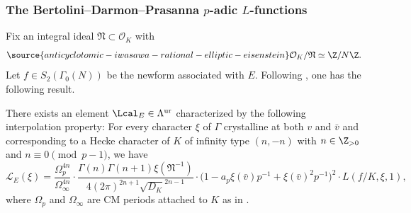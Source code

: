 \subsubsection{The Bertolini--Darmon--Prasanna \texorpdfstring{$p$}{p}-adic \texorpdfstring{$L$}{l}-functions}

Fix an integral ideal $\mathfrak{N}\subset\mathcal{O}_K$ with
\begin{equation}\label{eq:N}
\source{anticyclotomic-iwasawa-rational-elliptic-eisenstein}
\mathcal{O}_K/\mathfrak{N}\simeq\Z/N\Z.
\end{equation}
Let $f\in S_2(\Gamma_0(N))$ be the newform associated with $E$. Following \cite{BDP}, one has the following result.

\begin{theorem}
\notready\label{thm:BDP}
There exists an element $\Lcal_E\in\Lambda^{\rm ur}$ characterized by the following interpolation property: For every character $\xi$ of $\Gamma$ crystalline at both $v$ and $\bar{v}$ and corresponding to a Hecke character of $K$ of infinity type $(n,-n)$ with $n\in\Z_{>0}$ and $n\equiv 0\pmod{p-1}$, we have
\[
\mathcal{L}_E(\xi)=\frac{\Omega_p^{4n}}{\Omega_\infty^{4n}}\cdot\frac{\Gamma(n)\Gamma(n+1)\xi(\mathfrak{N}^{-1})}{4(2\pi)^{2n+1}\sqrt{D_K}^{2n-1}}\cdot\bigl(1-a_p\xi(\bar{v})p^{-1}+\xi(\bar{v})^2p^{-1}\bigr)^2\cdot L(f/K,\xi,1),
\]
where $\Omega_p$ and $\Omega_\infty$ are CM periods attached to $K$ as in \cite[\S{2.5}]{cas-hsieh1}.
\end{theorem}

